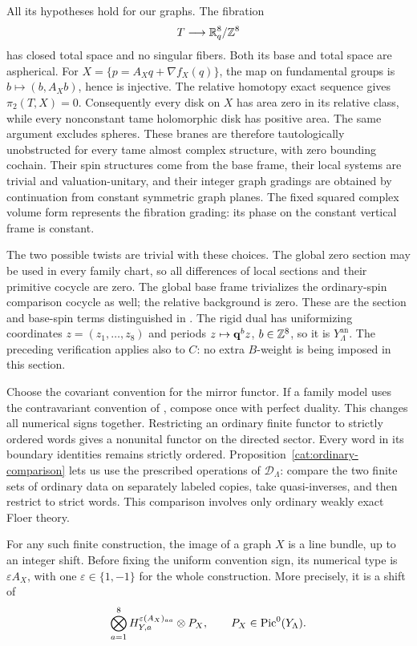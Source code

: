 All its hypotheses hold for our graphs.  The fibration
\[
 T\longrightarrow \mathbb R^8_q/\mathbb Z^8
\]
has closed total space and no singular fibers.  Both its base and total
space are aspherical.  For
$X=\{p=A_Xq+\nabla f_X(q)\}$, the map on fundamental groups is
$b\mapsto(b,A_Xb)$, hence is injective.  The relative homotopy exact
sequence gives $\pi_2(T,X)=0$.  Consequently every disk on $X$ has
area zero in its relative class, while every nonconstant tame
holomorphic disk has positive area.  The same argument excludes
spheres.  These branes are therefore tautologically unobstructed for
every tame almost complex structure, with zero bounding cochain.
Their spin structures come from the base frame, their local systems
are trivial and valuation-unitary, and their integer graph gradings
are obtained by continuation from constant symmetric graph planes.
The fixed squared complex volume form represents the fibration
grading: its phase on the constant vertical frame is constant.

The two possible twists are trivial with these choices.  The global
zero section may be used in every family chart, so all differences of
local sections and their primitive cocycle are zero.  The global
base frame trivializes the ordinary-spin comparison cocycle as well;
the relative background is zero.  These are the section and base-spin
terms distinguished in \cite[Remark~2.16]{abouzaid-hms}.  The rigid dual
has uniformizing coordinates $z=(z_1,\ldots,z_8)$ and periods
$z\mapsto\mathbf q^b z$, $b\in\mathbb Z^8$, so it is $Y_\Lambda^{\mathrm{an}}$.
The preceding verification applies also to $C$: no extra $B$-weight is
being imposed in this section.

Choose the covariant convention for the mirror functor.  If a family
model uses the contravariant convention of
\cite[Equation~(1.1)]{abouzaid-hms}, compose once with perfect duality.
This changes all numerical signs together.  Restricting an ordinary
finite functor to strictly ordered words gives a nonunital functor on
the directed sector.  Every word in its boundary identities remains
strictly ordered.  Proposition~\ref{cat:ordinary-comparison} lets
us use the prescribed operations of $\mathcal D_\Lambda$: compare the
two finite sets of ordinary data on separately labeled copies, take
quasi-inverses, and then restrict to strict words.  This comparison
involves only ordinary weakly exact Floer theory.

\begin{lemma}
\label{mirror:graph-image}
For any such finite construction, the image of a graph $X$ is a line
bundle, up to an integer shift.  Before fixing the uniform convention
sign, its numerical type is $\varepsilon A_X$, with one
$\varepsilon\in\{1,-1\}$ for the whole construction.  More precisely,
it is a shift of
\[
 \bigotimes_{a=1}^8H_{Y,a}^{\varepsilon(A_X)_{aa}}\otimes P_X,
 \qquad P_X\in\operatorname{Pic}^0(Y_\Lambda).
\]
\end{lemma}

